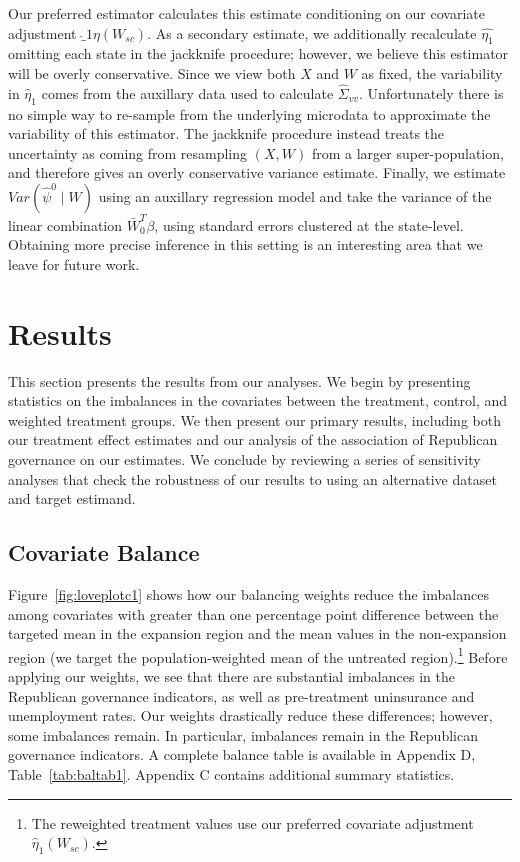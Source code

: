 \documentclass[aoas]{imsart}
\theoremstyle{plain}
\theoremstyle{remark}
\begin{document}
Our preferred estimator calculates this estimate conditioning on our covariate adjustment $\hat_1{\eta}(W_{sc})$. As a secondary estimate, we additionally recalculate $\hat{\eta_1}$ omitting each state in the jackknife procedure; however, we believe this estimator will be overly conservative. Since we view both $X$ and $W$ as fixed, the variability in $\hat{\eta}_1$ comes from the auxillary data used to calculate $\hat{\Sigma}_{vv}$. Unfortunately there is no simple way to re-sample from the underlying microdata to approximate the variability of this estimator. The jackknife procedure instead treats the uncertainty as coming from resampling $(X, W)$ from a larger super-population, and therefore gives an overly conservative variance estimate. Finally, we estimate $Var(\hat{\psi}^0 \mid W)$ using an auxillary regression model and take the variance of the linear combination $\bar{W}_0^T\beta$, using standard errors clustered at the state-level. Obtaining more precise inference in this setting is an interesting area that we leave for future work.

\section{Results}

This section presents the results from our analyses. We begin by presenting statistics on the imbalances in the covariates between the treatment, control, and weighted treatment groups. We then present our primary results, including both our treatment effect estimates and our analysis of the association of Republican governance on our estimates. We conclude by reviewing a series of sensitivity analyses that check the robustness of our results to using an alternative dataset and target estimand.

\subsection{Covariate Balance}

Figure~\ref{fig:loveplotc1} shows how our balancing weights reduce the imbalances among covariates with greater than one percentage point difference between the targeted mean in the expansion region and the mean values in the non-expansion region (we target the population-weighted mean of the untreated region).\footnote{The reweighted treatment values use our preferred covariate adjustment $\hat{\eta}_1(W_{sc})$.} Before applying our weights, we see that there are substantial imbalances in the Republican governance indicators, as well as pre-treatment uninsurance and unemployment rates. Our weights drastically reduce these differences; however, some imbalances remain. In particular, imbalances remain in the Republican governance indicators. A complete balance table is available in Appendix D, Table~\ref{tab:baltab1}. Appendix C contains additional summary statistics. 
\end{document}
